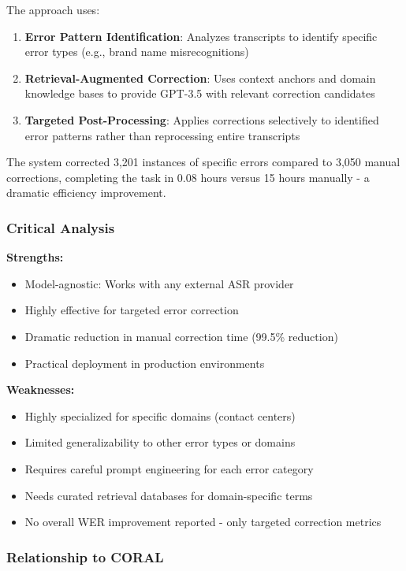 The approach uses:

\begin{enumerate}
    \item \textbf{Error Pattern Identification}: Analyzes transcripts to identify specific error types (e.g., brand name misrecognitions)
    \item \textbf{Retrieval-Augmented Correction}: Uses context anchors and domain knowledge bases to provide GPT-3.5 with relevant correction candidates
    \item \textbf{Targeted Post-Processing}: Applies corrections selectively to identified error patterns rather than reprocessing entire transcripts
\end{enumerate}

The system corrected 3,201 instances of specific errors compared to 3,050 manual corrections, completing the task in 0.08 hours versus 15 hours manually - a dramatic efficiency improvement.

\subsubsection{Critical Analysis}

\textbf{Strengths:}
\begin{itemize}
    \item Model-agnostic: Works with any external ASR provider
    \item Highly effective for targeted error correction
    \item Dramatic reduction in manual correction time (99.5\% reduction)
    \item Practical deployment in production environments
\end{itemize}

\textbf{Weaknesses:}
\begin{itemize}
    \item Highly specialized for specific domains (contact centers)
    \item Limited generalizability to other error types or domains
    \item Requires careful prompt engineering for each error category
    \item Needs curated retrieval databases for domain-specific terms
    \item No overall WER improvement reported - only targeted correction metrics
\end{itemize}

\subsubsection{Relationship to CORAL}

